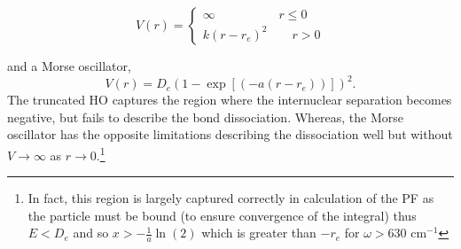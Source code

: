 \documentclass[../main.tex]{subfiles}
\begin{document}
\begin{equation}
	V(r) = \begin{cases}
		\infty \qquad\qquad\;\;\;\; r \le 0 \\
		k (r - r_e)^2 \qquad r > 0
	\end{cases}
\end{equation}

and a Morse oscillator,
\begin{equation}
	V(r) = D_e(1 - \exp\left[(-a(r- r_e))\right])^2.
\end{equation}
The truncated HO captures the region where the internuclear separation becomes negative, but fails to describe the bond dissociation. Whereas, the Morse oscillator has the opposite limitations describing the dissociation well but without $V \rightarrow \infty$ as $r \rightarrow 0$.\footnote{In fact, this region is largely captured correctly in calculation of the PF as the particle must be bound (to ensure convergence of the integral) thus $E < D_e$ and so $x > -\frac{1}{a}\ln(2)$ which is greater than $ -r_e$ for $\omega > 630$ cm$^{-1}$} 
\end{document}
